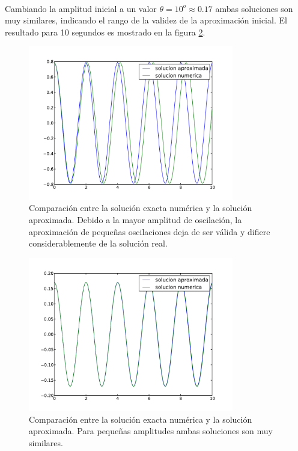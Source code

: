 \

Cambiando la amplitud inicial a un valor $\theta = 10^o \approx 0.17$ 
ambas soluciones son muy similares, indicando el rango de la validez de 
la aproximación inicial. El resultado para 10 segundos es mostrado en la 
figura \ref{fig:small_pedulum}.


\begin{figure}[htbp]
	\centering
	\includegraphics[width=0.80\textwidth]
	{./pictures/demo2_02.pdf}

	\caption{\small{Comparación entre la solución exacta numérica y la 
	solución aproximada. Debido a la mayor amplitud de oscilación, la 
	aproximación de pequeñas oscilaciones deja de ser válida y difiere 
	considerablemente de la solución real.}}
	
	\label{fig:numeric_pedulum}
\end{figure}


\begin{figure}[htbp]
	\centering
	\includegraphics[width=0.80\textwidth]
	{./pictures/demo2_02(02).pdf}

	\caption{\small{Comparación entre la solución exacta numérica y la 
	solución aproximada. Para pequeñas amplitudes ambas soluciones son
	muy similares.}}
	
	\label{fig:small_pedulum}
\end{figure}
\newpage

